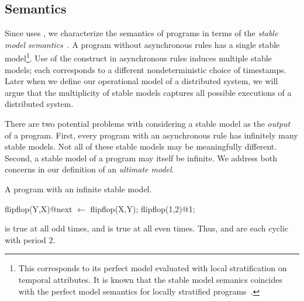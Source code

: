 
\subsection{Semantics}
Since \lang uses , we characterize the semantics of \lang programs in terms of the {\em stable model semantics}~\cite{stable-model}.  A \lang program without asynchronous rules has a single stable model\footnote{This corresponds to its perfect model evaluated with local stratification on temporal attributes.  It is known that the stable model semanics coincides with the perfect model semantics for locally stratified programs~\cite{stable-model}.}.  Use of the  construct in asynchronous rules induces multiple stable models; each corresponds to a different nondeterministic choice of timestamps.  Later when we define our operational model of a distributed system, we will argue that the multiplicity of stable models captures all possible executions of a distributed system.

There are two potential problems with considering a stable model as the {\em output} of a \lang program.  First, every program with an asynchronous rule has infinitely many stable models.  Not all of these stable models may be meaningfully different.  Second, a stable model of a \lang program may itself be infinite.  We address both concerns in our definition of an {\em ultimate model}.

\begin{example}
\label{ex:flipflop}
A \lang program with an infinite stable model.

\begin{Dedalus}
flipflop(Y,X)@next \(\leftarrow\) flipflop(X,Y);
flipflop(1,2)@1;
\end{Dedalus}

 is true at all odd times, and  is true at all even times.  Thus,  and  are each cyclic with period 2.
\end{example}


